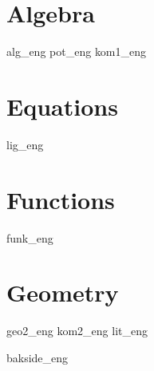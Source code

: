 \chapter{Algebra}
\newpage
{alg_eng}
{pot_eng}
\newpage
{kom1_eng}

\chapter{Equations \label{Likningar}}
\newpage
{lig_eng}

\chapter{Functions \label{Funksjoner}}
{funk_eng}

\chapter{Geometry}
\newpage
{geo2_eng}
\newpage
{kom2_eng}
{lit_eng}
{\printindex {}
	}
{bakside_eng}













